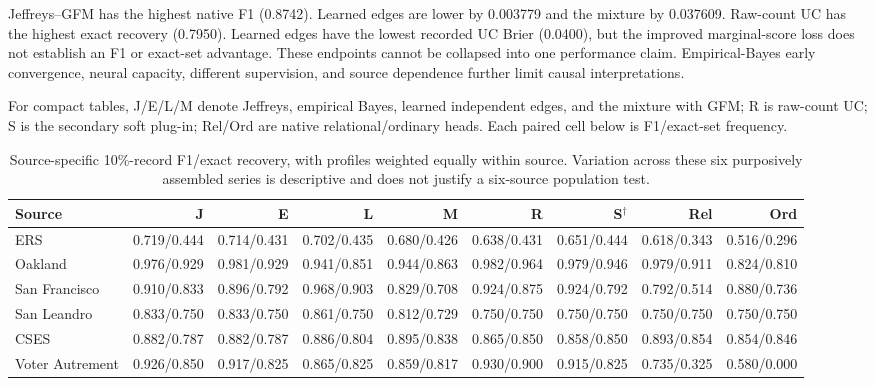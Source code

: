 Jeffreys--GFM has the highest native F1 (0.8742). Learned edges are lower by 0.003779 and the mixture by 0.037609. Raw-count UC has the highest exact recovery (0.7950). Learned edges have the lowest recorded UC Brier (0.0400), but the improved marginal-score loss does not establish an F1 or exact-set advantage. These endpoints cannot be collapsed into one performance claim. Empirical-Bayes early convergence, neural capacity, different supervision, and source dependence further limit causal interpretations.

For compact tables, J/E/L/M denote Jeffreys, empirical Bayes, learned independent edges, and the mixture with GFM; R is raw-count UC; S is the secondary soft plug-in; Rel/Ord are native relational/ordinary heads. Each paired cell below is F1/exact-set frequency.
\begin{table}[ht]\centering\scriptsize\setlength{\tabcolsep}{2pt}
\begin{tabular*}{\linewidth}{@{\extracolsep{\fill}}lrrrrrrrr@{}}\toprule
Source & J & E & L & M & R & S$^{\dagger}$ & Rel & Ord\\\midrule
ERS & 0.719/0.444 & 0.714/0.431 & 0.702/0.435 & 0.680/0.426 & 0.638/0.431 & 0.651/0.444 & 0.618/0.343 & 0.516/0.296\\
Oakland & 0.976/0.929 & 0.981/0.929 & 0.941/0.851 & 0.944/0.863 & 0.982/0.964 & 0.979/0.946 & 0.979/0.911 & 0.824/0.810\\
San Francisco & 0.910/0.833 & 0.896/0.792 & 0.968/0.903 & 0.829/0.708 & 0.924/0.875 & 0.924/0.792 & 0.792/0.514 & 0.880/0.736\\
San Leandro & 0.833/0.750 & 0.833/0.750 & 0.861/0.750 & 0.812/0.729 & 0.750/0.750 & 0.750/0.750 & 0.750/0.750 & 0.750/0.750\\
CSES & 0.882/0.787 & 0.882/0.787 & 0.886/0.804 & 0.895/0.838 & 0.865/0.850 & 0.858/0.850 & 0.893/0.854 & 0.854/0.846\\
Voter Autrement & 0.926/0.850 & 0.917/0.825 & 0.865/0.825 & 0.859/0.817 & 0.930/0.900 & 0.915/0.825 & 0.735/0.325 & 0.580/0.000\\
\bottomrule\end{tabular*}
\caption{Source-specific 10\%-record F1/exact recovery, with profiles weighted equally within source. Variation across these six purposively assembled series is descriptive and does not justify a six-source population test.}\label{tab:posterior-native-sources}\end{table}

